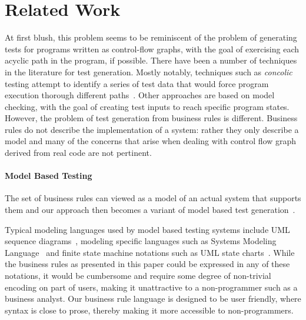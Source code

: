 \section{Related Work}
\label{sec:related}

At first blush, this problem seems to be reminiscent of the problem of
generating tests for programs written as control-flow graphs, with the
goal of exercising each acyclic path in the program, if possible.
There have been a number of techniques in the literature for test
generation. Mostly notably, techniques such as \textit{concolic}
testing attempt to identify a series of test data that would force
program execution thorough different paths~\cite{dart, concolic}.  Other
approaches are based on model checking, with the goal of creating test
inputs to reach specific program states.
However, the problem of test generation from business rules is
different. Business rules do not describe the implementation of a
system: rather they only describe a model and many of the concerns
that arise when dealing with control flow graph derived from real code
are not pertinent.

\paragraph*{Model Based Testing} The set of business rules can viewed as a model of an actual system
that supports them and our approach then becomes a variant of model
based test generation~\cite{utting2012}.

Typical modeling languages used by model based testing systems include
UML sequence diagrams~\cite{nayak2009}, modeling specific languages
such as Systems Modeling Language~\cite{friedenthal2011} and
finite state machine notations such as UML state
charts~\cite{offhut99}. While the business rules as presented in this
paper could be expressed in any of these notations, it would be
cumbersome and require some degree of non-trivial encoding on part of
users, making it unattractive to a non-programmer such as a business analyst. Our business
rule language is designed to be user friendly, where syntax
is close to prose, thereby making it more accessible to non-programmers.


